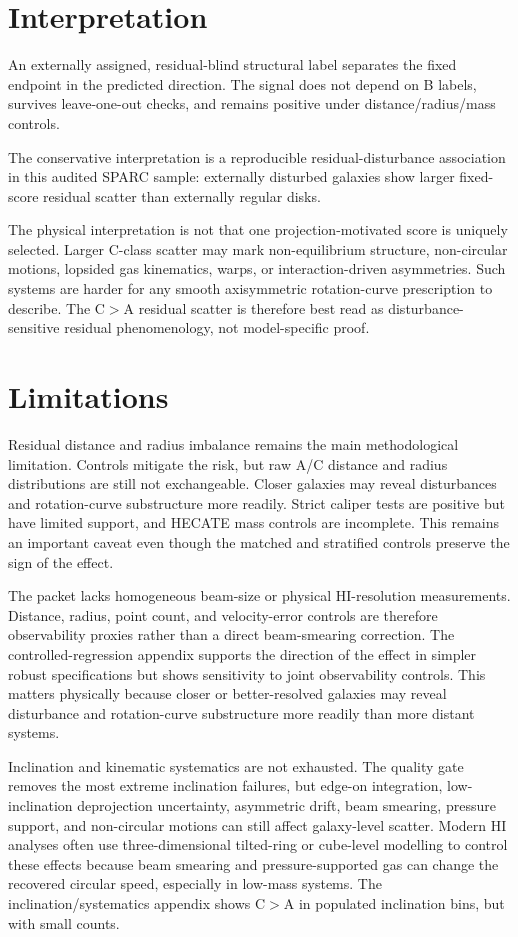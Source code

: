 \documentclass[11pt]{article}
\begin{document}
\section{Interpretation}
An externally assigned, residual-blind structural label separates the fixed endpoint in the predicted direction. The signal does not depend on B labels, survives leave-one-out checks, and remains positive under distance/radius/mass controls.

The conservative interpretation is a reproducible residual-disturbance association in this audited SPARC sample: externally disturbed galaxies show larger fixed-score residual scatter than externally regular disks.

The physical interpretation is not that one projection-motivated score is uniquely selected. Larger C-class scatter may mark non-equilibrium structure, non-circular motions, lopsided gas kinematics, warps, or interaction-driven asymmetries. Such systems are harder for any smooth axisymmetric rotation-curve prescription to describe. The C$>$A residual scatter is therefore best read as disturbance-sensitive residual phenomenology, not model-specific proof.

\section{Limitations}
Residual distance and radius imbalance remains the main methodological limitation. Controls mitigate the risk, but raw A/C distance and radius distributions are still not exchangeable. Closer galaxies may reveal disturbances and rotation-curve substructure more readily. Strict caliper tests are positive but have limited support, and HECATE mass controls are incomplete. This remains an important caveat even though the matched and stratified controls preserve the sign of the effect.

The packet lacks homogeneous beam-size or physical HI-resolution measurements. Distance, radius, point count, and velocity-error controls are therefore observability proxies rather than a direct beam-smearing correction. The controlled-regression appendix supports the direction of the effect in simpler robust specifications but shows sensitivity to joint observability controls. This matters physically because closer or better-resolved galaxies may reveal disturbance and rotation-curve substructure more readily than more distant systems.

Inclination and kinematic systematics are not exhausted. The quality gate removes the most extreme inclination failures, but edge-on integration, low-inclination deprojection uncertainty, asymmetric drift, beam smearing, pressure support, and non-circular motions can still affect galaxy-level scatter. Modern HI analyses often use three-dimensional tilted-ring or cube-level modelling to control these effects because beam smearing and pressure-supported gas can change the recovered circular speed, especially in low-mass systems. The inclination/systematics appendix shows C$>$A in populated inclination bins, but with small counts.
\end{document}
